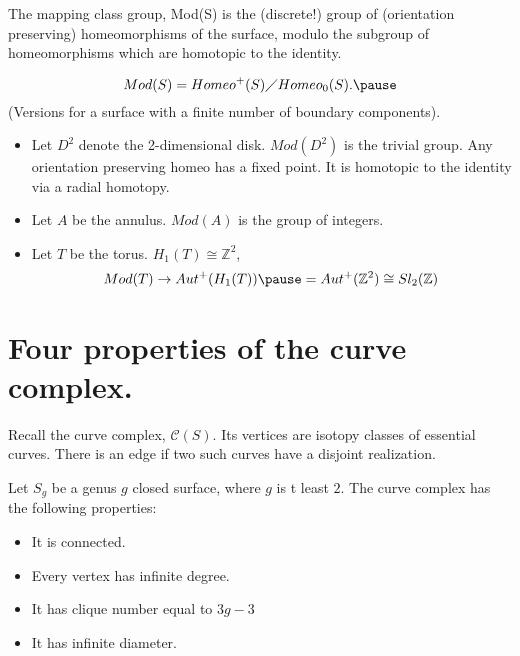 \documentclass[handout]{beamer}
\theoremstyle{plain}
\begin{document}
\begin{frame}

\begin{definition}
The  mapping class group, Mod(S) is the  (discrete!) group  of  (orientation preserving) homeomorphisms of  the  surface, modulo  the subgroup of homeomorphisms  which  are  homotopic  to  the  identity. \pause

$$ Mod(S)= Homeo^{+}(S)\diagup Homeo_{0}(S). \pause $$
(Versions for  a  surface with  a  finite  number  of boundary  components). 
 
 \end{definition}
 \end{frame}
 
\begin{frame}

\begin{example}
\begin{itemize}

\item Let $D^2$ denote  the  2-dimensional  disk. $Mod(D^2)$ is  the  trivial  group. Any orientation preserving  homeo  has  a  fixed  point. \pause It  is homotopic  to  the  identity  via  a  radial homotopy. \pause
\item Let  $A$  be  the  annulus. $Mod(A)$ is  the group  of  integers. \pause 
\item Let $T$ be  the  torus. \pause  $H_1(T)\cong \mathbb{Z}^2$, \pause 
$$Mod(T) \to Aut^{+}(H_{1}(T))\pause = Aut^{+}(\mathbb{Z}^2)\cong Sl_2(\mathbb{Z}) $$ 
\end{itemize}
\end{example}
\end{frame}



\section{Four  properties  of the curve  complex.  }
\begin{frame}
Recall  the  curve  complex, $\mathcal{C}(S)$. Its   vertices  are   isotopy  classes  of  essential  curves. There  is  an  edge  if two  such  curves  have  a  disjoint  realization. 

 \begin{theorem}
Let  $S_g$ be  a  genus  $g$  closed  surface, where  $g$  is t  least $2$. 
The  curve  complex  has  the  following  properties: 
\begin{itemize}
\item  It  is  connected. 
\item Every  vertex  has  infinite degree. 
\item It  has  clique  number  equal  to $3g-3$
\item It  has infinite  diameter.  
\end{itemize}
\end{theorem}
\end{frame}
\end{document}
